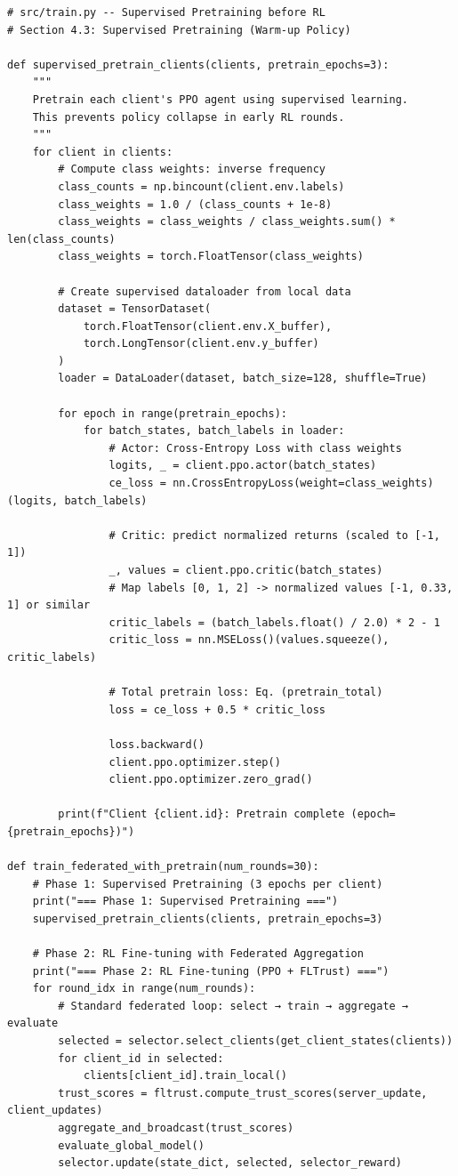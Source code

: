 \documentclass[12pt,a4paper]{article}
\begin{document}
\begin{lstlisting}[caption=Supervised Pretraining Pipeline, label=lst:pretrain]
# src/train.py -- Supervised Pretraining before RL
# Section 4.3: Supervised Pretraining (Warm-up Policy)

def supervised_pretrain_clients(clients, pretrain_epochs=3):
    """
    Pretrain each client's PPO agent using supervised learning.
    This prevents policy collapse in early RL rounds.
    """
    for client in clients:
        # Compute class weights: inverse frequency
        class_counts = np.bincount(client.env.labels)
        class_weights = 1.0 / (class_counts + 1e-8)
        class_weights = class_weights / class_weights.sum() * len(class_counts)
        class_weights = torch.FloatTensor(class_weights)

        # Create supervised dataloader from local data
        dataset = TensorDataset(
            torch.FloatTensor(client.env.X_buffer),
            torch.LongTensor(client.env.y_buffer)
        )
        loader = DataLoader(dataset, batch_size=128, shuffle=True)

        for epoch in range(pretrain_epochs):
            for batch_states, batch_labels in loader:
                # Actor: Cross-Entropy Loss with class weights
                logits, _ = client.ppo.actor(batch_states)
                ce_loss = nn.CrossEntropyLoss(weight=class_weights)(logits, batch_labels)

                # Critic: predict normalized returns (scaled to [-1, 1])
                _, values = client.ppo.critic(batch_states)
                # Map labels [0, 1, 2] -> normalized values [-1, 0.33, 1] or similar
                critic_labels = (batch_labels.float() / 2.0) * 2 - 1
                critic_loss = nn.MSELoss()(values.squeeze(), critic_labels)

                # Total pretrain loss: Eq. (pretrain_total)
                loss = ce_loss + 0.5 * critic_loss

                loss.backward()
                client.ppo.optimizer.step()
                client.ppo.optimizer.zero_grad()

        print(f"Client {client.id}: Pretrain complete (epoch={pretrain_epochs})")

def train_federated_with_pretrain(num_rounds=30):
    # Phase 1: Supervised Pretraining (3 epochs per client)
    print("=== Phase 1: Supervised Pretraining ===")
    supervised_pretrain_clients(clients, pretrain_epochs=3)

    # Phase 2: RL Fine-tuning with Federated Aggregation
    print("=== Phase 2: RL Fine-tuning (PPO + FLTrust) ===")
    for round_idx in range(num_rounds):
        # Standard federated loop: select → train → aggregate → evaluate
        selected = selector.select_clients(get_client_states(clients))
        for client_id in selected:
            clients[client_id].train_local()
        trust_scores = fltrust.compute_trust_scores(server_update, client_updates)
        aggregate_and_broadcast(trust_scores)
        evaluate_global_model()
        selector.update(state_dict, selected, selector_reward)
\end{lstlisting}
\end{document}
